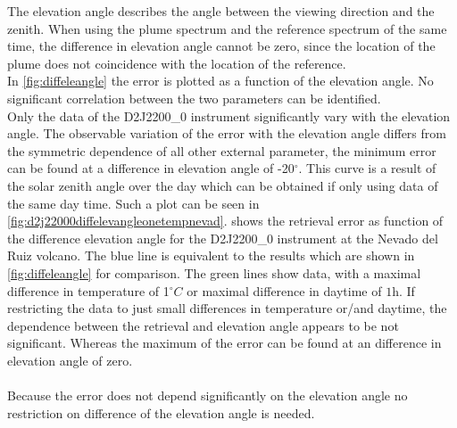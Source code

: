 The elevation angle describes the angle between the viewing direction and the zenith. When using the plume spectrum and the reference spectrum of the same time, the difference in elevation angle cannot be zero, since the location of the plume does not coincidence with the location of the reference.\\
In \cref{fig:diffeleangle} the  error is plotted as a function of the elevation angle. No significant correlation between the two parameters can be identified. \\
Only the data of the D2J2200\_0 instrument significantly vary with the elevation angle. The observable variation of the  error with the elevation angle differs from the symmetric dependence of all other external parameter, the minimum  error can be found at a difference in elevation angle of -20$^{\circ}$. This curve is a result of the solar zenith angle over the day which can be obtained if only using data of the same day time. Such a plot can be seen in \cref{fig:d2j22000diffelevangleonetempnevad}.
 shows the  retrieval error as function of the difference elevation angle for the D2J2200\_0 instrument at the Nevado del Ruiz volcano. The blue line is equivalent to the results which are shown in \cref{fig:diffeleangle} for comparison. The green lines show data, with a maximal difference in temperature of 1$^{\circ}C$ or maximal difference in daytime of $1$h. If restricting the data to just small differences in temperature or/and daytime, the dependence between the  retrieval and elevation angle appears to be not significant. Whereas the maximum of the  error can be found at an difference in elevation angle of zero.\\
\\	
Because the  error does not depend significantly on the elevation angle no restriction on difference of the elevation angle is needed.
